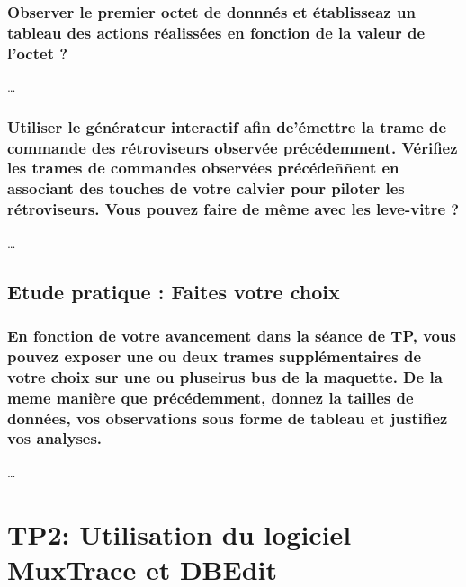 \documentclass{rapportECC}
\begin{document}
\subsubsection*{Observer le premier octet de donnnés et établisseaz un tableau des actions  réalissées en fonction de la valeur de l'octet ?}

\dots

\subsubsection*{Utiliser le générateur interactif afin de'émettre la trame de commande des rétroviseurs observée précédemment. Vérifiez les trames de commandes observées précédeññent en associant des touches de votre calvier pour piloter les rétroviseurs. Vous pouvez faire de même avec les leve-vitre ?}

\dots


\subsection{Etude pratique : Faites votre choix}

\subsubsection*{En fonction de votre avancement dans la séance de TP, vous pouvez exposer une ou deux trames supplémentaires de votre choix sur une ou pluseirus bus de la maquette. De la meme manière que précédemment, donnez la tailles de données, vos observations sous forme de tableau et justifiez vos analyses.}

\dots


\section{TP2: Utilisation du logiciel MuxTrace et DBEdit}
\end{document}
